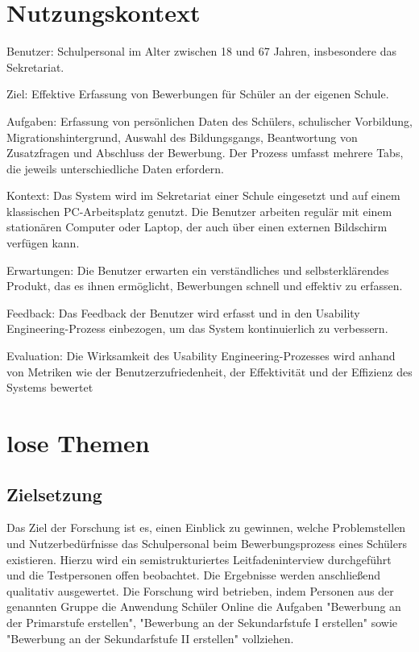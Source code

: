 
\section{Nutzungskontext}
Benutzer: Schulpersonal im Alter zwischen 18 und 67 Jahren, insbesondere das Sekretariat.

Ziel: Effektive Erfassung von Bewerbungen für Schüler an der eigenen Schule.

Aufgaben: Erfassung von persönlichen Daten des Schülers, schulischer Vorbildung, Migrationshintergrund, Auswahl des Bildungsgangs, Beantwortung von Zusatzfragen und Abschluss der Bewerbung. Der Prozess umfasst mehrere Tabs, die jeweils unterschiedliche Daten erfordern.

Kontext: Das System wird im Sekretariat einer Schule eingesetzt und auf einem klassischen PC-Arbeitsplatz genutzt. Die Benutzer arbeiten regulär mit einem stationären Computer oder Laptop, der auch über einen externen Bildschirm verfügen kann.

Erwartungen: Die Benutzer erwarten ein verständliches und selbsterklärendes Produkt, das es ihnen ermöglicht, Bewerbungen schnell und effektiv zu erfassen.

Feedback: Das Feedback der Benutzer wird erfasst und in den Usability Engineering-Prozess einbezogen, um das System kontinuierlich zu verbessern.

Evaluation: Die Wirksamkeit des Usability Engineering-Prozesses wird anhand von Metriken wie der Benutzerzufriedenheit, der Effektivität und der Effizienz des Systems bewertet

\section{lose Themen}
\subsection{Zielsetzung}
Das Ziel der Forschung ist es, einen Einblick zu gewinnen, welche Problemstellen und Nutzerbedürfnisse das Schulpersonal beim Bewerbungsprozess eines Schülers existieren. Hierzu wird ein semistrukturiertes Leitfadeninterview durchgeführt und die Testpersonen offen beobachtet. Die Ergebnisse werden anschließend qualitativ ausgewertet. Die Forschung wird betrieben, indem Personen aus der genannten Gruppe die Anwendung Schüler Online die Aufgaben "Bewerbung an der Primarstufe erstellen", "Bewerbung an der Sekundarfstufe I erstellen" sowie "Bewerbung an der Sekundarfstufe II erstellen" vollziehen. 

